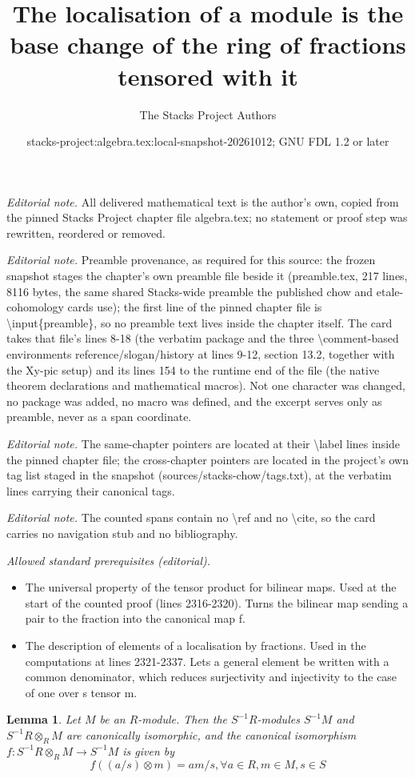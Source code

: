 \documentclass[10pt,a4paper]{amsart}
\title{The localisation of a module is the base change of the ring of fractions tensored with it}
\author{The Stacks Project Authors}
\date{stacks-project:algebra.tex:local-snapshot-20261012; GNU FDL 1.2 or later}
\theoremstyle{plain}
\newtheorem{lemma}[subsection]{Lemma}
\theoremstyle{definition}
\theoremstyle{remark}
\numberwithin{equation}{subsection}
\begin{document}
\maketitle
\noindent\textit{Editorial note.} All delivered mathematical text is the author's own, copied from the pinned Stacks Project chapter file algebra.tex; no statement or proof step was rewritten, reordered or removed.\par\medskip
\noindent\textit{Editorial note.} Preamble provenance, as required for this source: the frozen snapshot stages the chapter's own preamble file beside it (preamble.tex, 217 lines, 8116 bytes, the same shared Stacks-wide preamble the published chow and etale-cohomology cards use); the first line of the pinned chapter file is \textbackslash{}input\{preamble\}, so no preamble text lives inside the chapter itself. The card takes that file's lines 8-18 (the verbatim package and the three \textbackslash{}comment-based environments reference/slogan/history at lines 9-12, section 13.2, together with the Xy-pic setup) and its lines 154 to the runtime end of the file (the native theorem declarations and mathematical macros). Not one character was changed, no package was added, no macro was defined, and the excerpt serves only as preamble, never as a span coordinate.\par\medskip
\noindent\textit{Editorial note.} The same-chapter pointers are located at their \textbackslash{}label lines inside the pinned chapter file; the cross-chapter pointers are located in the project's own tag list staged in the snapshot (sources/stacks-chow/tags.txt), at the verbatim lines carrying their canonical tags.\par\medskip
\noindent\textit{Editorial note.} The counted spans contain no \textbackslash{}ref and no \textbackslash{}cite, so the card carries no navigation stub and no bibliography.\par\medskip
\noindent\textit{Allowed standard prerequisites (editorial).}\begin{itemize}
\item The universal property of the tensor product for bilinear maps. Used at the start of the counted proof (lines 2316-2320). Turns the bilinear map sending a pair to the fraction into the canonical map f.
\item The description of elements of a localisation by fractions. Used in the computations at lines 2321-2337. Lets a general element be written with a common denominator, which reduces surjectivity and injectivity to the case of one over s tensor m.
\end{itemize}\medskip
\begin{lemma}
\label{lemma-tensor-localization}
Let $M$ be an $R$-module. Then the $S^{-1}R$-modules $S^{-1}M$
and $S^{-1}R \otimes_R M$ are canonically isomorphic, and the
canonical isomorphism $f : S^{-1}R \otimes_R M \to S^{-1}M$
is given by
$$
f((a/s) \otimes m) = am/s, \forall a \in R, m \in M, s \in S
$$
\end{lemma}
\end{document}
